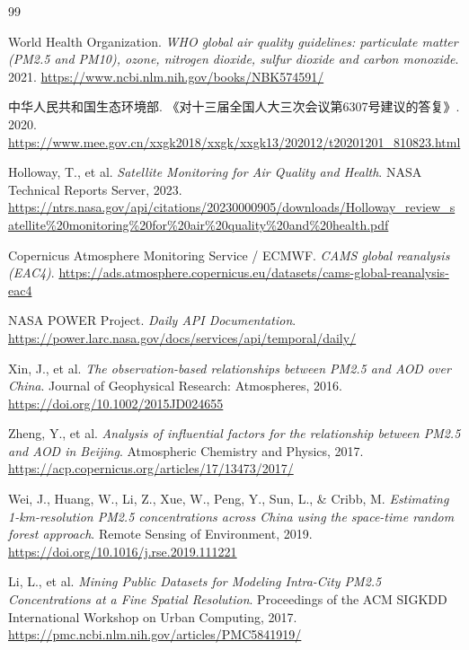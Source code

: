 ﻿\documentclass[UTF8,zihao=-4,a4paper]{ctexart}
\begin{document}
\begin{thebibliography}{99}

World Health Organization. \textit{WHO global air quality guidelines: particulate matter (PM2.5 and PM10), ozone, nitrogen dioxide, sulfur dioxide and carbon monoxide}. 2021. \url{https://www.ncbi.nlm.nih.gov/books/NBK574591/}

中华人民共和国生态环境部. 《对十三届全国人大三次会议第6307号建议的答复》. 2020. \url{https://www.mee.gov.cn/xxgk2018/xxgk/xxgk13/202012/t20201201_810823.html}

Holloway, T., et al. \textit{Satellite Monitoring for Air Quality and Health}. NASA Technical Reports Server, 2023. \url{https://ntrs.nasa.gov/api/citations/20230000905/downloads/Holloway_review_satellite%20monitoring%20for%20air%20quality%20and%20health.pdf}

Copernicus Atmosphere Monitoring Service / ECMWF. \textit{CAMS global reanalysis (EAC4)}. \url{https://ads.atmosphere.copernicus.eu/datasets/cams-global-reanalysis-eac4}

NASA POWER Project. \textit{Daily API Documentation}. \url{https://power.larc.nasa.gov/docs/services/api/temporal/daily/}

Xin, J., et al. \textit{The observation-based relationships between PM2.5 and AOD over China}. Journal of Geophysical Research: Atmospheres, 2016. \url{https://doi.org/10.1002/2015JD024655}

Zheng, Y., et al. \textit{Analysis of influential factors for the relationship between PM2.5 and AOD in Beijing}. Atmospheric Chemistry and Physics, 2017. \url{https://acp.copernicus.org/articles/17/13473/2017/}

Wei, J., Huang, W., Li, Z., Xue, W., Peng, Y., Sun, L., \& Cribb, M. \textit{Estimating 1-km-resolution PM2.5 concentrations across China using the space-time random forest approach}. Remote Sensing of Environment, 2019. \url{https://doi.org/10.1016/j.rse.2019.111221}

Li, L., et al. \textit{Mining Public Datasets for Modeling Intra-City PM2.5 Concentrations at a Fine Spatial Resolution}. Proceedings of the ACM SIGKDD International Workshop on Urban Computing, 2017. \url{https://pmc.ncbi.nlm.nih.gov/articles/PMC5841919/}

\end{thebibliography}
\end{document}
